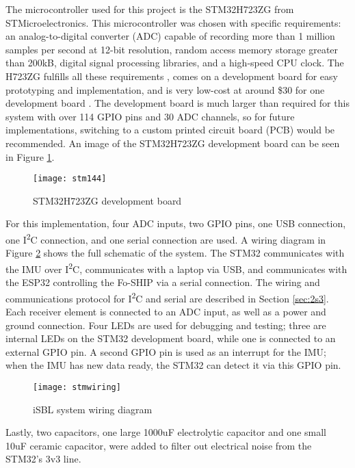 \documentclass[11pt]{ucthesisCP}
\begin{document}
The microcontroller used for this project is the STM32H723ZG from STMicroelectronics. This microcontroller was chosen with specific requirements: an analog-to-digital converter (ADC) capable of recording more than 1 million samples per second at 12-bit resolution, random access memory storage greater than 200kB, digital signal processing libraries, and a high-speed CPU clock. The H723ZG fulfills all these requirements \cite{stmdatasheet}, comes on a development board for easy prototyping and implementation, and is very low-cost at around \$30 for one development board \cite{stm144}. The development board is much larger than required for this system with over 114 GPIO pins and 30 ADC channels, so for future implementations, switching to a custom printed circuit board (PCB) would be recommended. An image of the STM32H723ZG development board can be seen in Figure \ref{fig:stm144}.

\begin{figure}[htbp]
	\centering
	\texttt{[image: stm144]}
	\caption{STM32H723ZG development board \cite{stm144}}
	\label{fig:stm144}
\end{figure}

For this implementation, four ADC inputs, two GPIO pins, one USB connection, one I\textsuperscript{2}C connection, and one serial connection are used. A wiring diagram in Figure \ref{fig:stmwiring} shows the full schematic of the system. The STM32 communicates with the IMU over I\textsuperscript{2}C, communicates with a laptop via USB, and communicates with the ESP32 controlling the Fo-SHIP via a serial connection. The wiring and communications protocol for I\textsuperscript{2}C and serial are described in Section \ref{sec:2s3}. Each receiver element is connected to an ADC input, as well as a power and ground connection. Four LEDs are used for debugging and testing; three are internal LEDs on the STM32 development board, while one is connected to an external GPIO pin. A second GPIO pin is used as an interrupt for the IMU; when the IMU has new data ready, the STM32 can detect it via this GPIO pin.

\begin{figure}[!htbp]
	\centering
	\texttt{[image: stmwiring]}
	\caption{iSBL system wiring diagram}
	\label{fig:stmwiring}
\end{figure}

Lastly, two capacitors, one large 1000uF electrolytic capacitor and one small 10uF ceramic capacitor, were added to filter out electrical noise from the STM32’s 3v3 line. 
\end{document}
